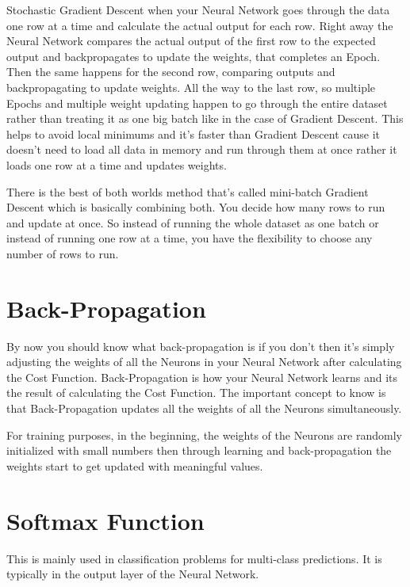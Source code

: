\documentclass[
]{book}
\begin{document}
Stochastic Gradient Descent when your Neural Network goes through the data one row at a time and calculate the actual output for each row. Right away the Neural Network compares the actual output of the first row to the expected output and backpropagates to update the weights, that completes an Epoch. Then the same happens for the second row, comparing outputs and backpropagating to update weights. All the way to the last row, so multiple Epochs and multiple weight updating happen to go through the entire dataset rather than treating it as one big batch like in the case of Gradient Descent. This helps to avoid local minimums and it's faster than Gradient Descent cause it doesn't need to load all data in memory and run through them at once rather it loads one row at a time and updates weights.

There is the best of both worlds method that's called mini-batch Gradient Descent which is basically combining both. You decide how many rows to run and update at once. So instead of running the whole dataset as one batch or instead of running one row at a time, you have the flexibility to choose any number of rows to run.

\hypertarget{back-propagation}{%
\section{Back-Propagation}\label{back-propagation}}

By now you should know what back-propagation is if you don't then it's simply adjusting the weights of all the Neurons in your Neural Network after calculating the Cost Function. Back-Propagation is how your Neural Network learns and its the result of calculating the Cost Function. The important concept to know is that Back-Propagation updates all the weights of all the Neurons simultaneously.

For training purposes, in the beginning, the weights of the Neurons are randomly initialized with small numbers then through learning and back-propagation the weights start to get updated with meaningful values.

\hypertarget{softmax-function}{%
\section{Softmax Function}\label{softmax-function}}

This is mainly used in classification problems for multi-class predictions. It is typically in the output layer of the Neural Network.
\end{document}
